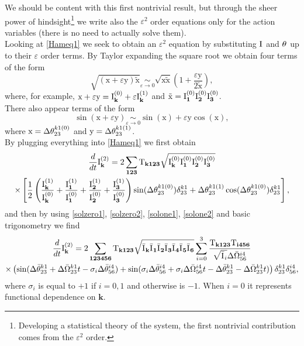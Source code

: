 We should be content with this first nontrivial result, but through the sheer power of hindsight\footnote{Developing a 
statistical theory of the system, the first nontrivial contribution comes from the $\varepsilon^2$ order.}
we write also the 
$\varepsilon^2$ order equations only for the action variables (there is no need to actually solve them). \\
Looking at \eqref{Hameq1} we seek to obtain an $\varepsilon^2$ equation by substituting $\mathrm{I}^{}$ and $\theta^{}$ up to their $\varepsilon$ order terms. By Taylor expanding the square root 
we obtain four terms of the form
\begin{equation}
    \sqrt{(\mathrm{x} +\varepsilon \mathrm{y})\mathrm{\tilde{x}}} \underset{\varepsilon \rightarrow 0}{\sim} 
    \sqrt{\mathrm{x}\mathrm{\tilde{x}}}\left( 1 + \frac{\varepsilon \mathrm{y}}{2\mathrm{\tilde{x}}}\right),
\end{equation}
where, for example, $\mathrm{x} + \varepsilon \mathrm{y} = \mathrm{I}^{(0)}_\mathbf{k} + \varepsilon \mathrm{I}^{(1)}_\mathbf{k}$ and $\mathrm{\tilde{x}} = \mathrm{I}^{(0)}_\mathbf{1}\mathrm{I}^{(0)}_\mathbf{2}\mathrm{I}^{(0)}_\mathbf{3}$.\\
There also appear terms of the form
\begin{equation}
    \sin(\mathrm{x} + \varepsilon \mathrm{y}) \underset{\varepsilon \rightarrow 0}{\sim} \sin(\mathrm{x}) + \varepsilon \mathrm{y} \cos(\mathrm{x}),
\end{equation} 
where $\mathrm{x} = \Delta\theta^{k1(0)}_{23}$ and $\mathrm{y} = \Delta\theta^{k1(1)}_{23}$.\\
By plugging everything into \eqref{Hameq1} we first obtain
\begin{multline}
    \frac{d}{dt} \mathrm{I}^{(2)}_\mathbf{k} = 2 \sum_{\mathbf{123}} \mathrm{T}_{\mathbf{k123}} \sqrt{\mathrm{I}^{(0)}_\mathbf{k}\mathrm{I}^{(0)}_\mathbf{1}\mathrm{I}^{(0)}_\mathbf{2}\mathrm{I}^{(0)}_\mathbf{3}} \\ \times \left[ \frac{1}{2}\left(\frac{\mathrm{I}^{(1)}_\mathbf{k}}{\mathrm{I}^{(0)}_\mathbf{k}}+\frac{\mathrm{I}^{(1)}_\mathbf{1}}{\mathrm{I}^{(0)}_\mathbf{1}}+
    \frac{\mathrm{I}^{(1)}_\mathbf{2}}{\mathrm{I}^{(0)}_\mathbf{2}}+\frac{\mathrm{I}^{(1)}_\mathbf{3}}{\mathrm{I}^{(0)}_\mathbf{3}} \right)\sin(\Delta\theta^{k1(0)}_{23})\delta^{k1}_{23} + 
    \Delta\theta^{k1(1)}_{23}\cos(\Delta\theta^{k1(0)}_{23}) \delta^{k1}_{23}\right],
\end{multline}
and then by using \eqref{solzero1}, \eqref{solzero2}, \eqref{solone1}, \eqref{solone2} and basic trigonometry we find
\begin{multline}
    \frac{d}{dt} \mathrm{I}^{(2)}_\mathbf{k} = 2 \sum_{\mathbf{123456}}\mathrm{T}_{\mathbf{k123}} \sqrt{\bar{\mathrm{I}^{}}_\mathbf{k}\bar{\mathrm{I}^{}}_\mathbf{1}\bar{\mathrm{I}^{}}_\mathbf{2}\bar{\mathrm{I}^{}}_\mathbf{3}\bar{\mathrm{I}^{}}_\mathbf{4}\bar{\mathrm{I}^{}}_\mathbf{5}\bar{\mathrm{I}^{}}_\mathbf{6}} 
    \sum_{i=0}^{3}\frac{\mathrm{T}_{\mathbf{k123}}\mathrm{T}_\mathbf{i456}}{\sqrt{\bar{\mathrm{I}^{}}_i}\Delta\bar{\Omega}^{i4}_{56}} \\
    \times\left(\sin(\Delta\bar{\theta}^{k1}_{23} + \Delta\bar{\Omega}^{k1}_{23}t - \sigma_i \Delta\bar{\theta}^{i4}_{56}) 
    + \sin(\sigma_i \Delta\bar{\theta}^{i4}_{56} + \sigma_i\Delta\bar{\Omega}^{i4}_{56}t -\Delta\bar{\theta}^{k1}_{23} - \Delta\bar{\Omega}^{k1}_{23}t)  \right)\delta^{k1}_{23}\delta^{i4}_{56}, 
    \label{eqeps2}
\end{multline}
where $\sigma_i$ is equal to $+1$ if $i=0,1$ and otherwise is $-1$. When $i=0$ it represents functional dependence on $\mathbf{k}$.\\

